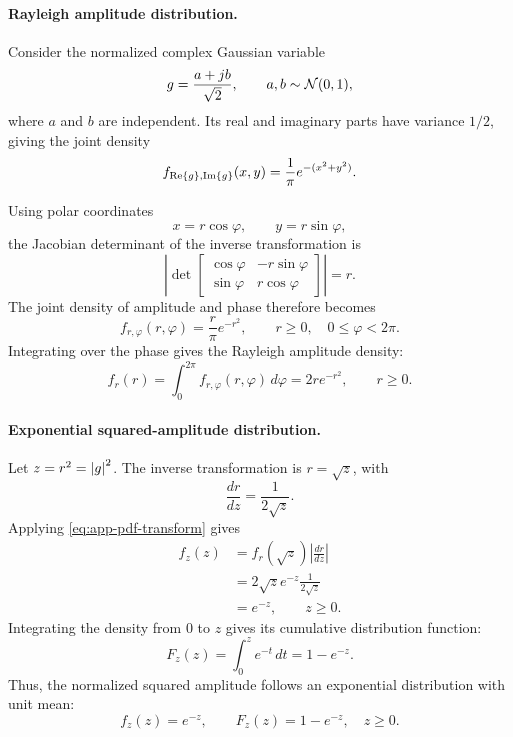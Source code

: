 \paragraph{Rayleigh amplitude distribution.}
Consider the normalized complex Gaussian variable
\begin{equation*}
	g=\frac{a+jb}{\sqrt{2}},
	\qquad
	a,b\sim\mathcal{N}(0,1),
\end{equation*}
where $a$ and $b$ are independent. Its real and imaginary parts have variance $1/2$, giving the joint density
\begin{equation*}
	f_{\operatorname{Re}\left\{g\right\},\operatorname{Im}\left\{g\right\}}(x,y)
	=\frac{1}{\pi}e^{-(x^2+y^2)}.
\end{equation*}

Using polar coordinates
\begin{equation*}
	x=r\cos\varphi,\qquad
	y=r\sin\varphi,
\end{equation*}
the Jacobian determinant of the inverse transformation is
\begin{equation*}
	\left|
	\det{
		\begin{bmatrix}
			\cos\varphi&-r\sin\varphi\\
			\sin\varphi&r\cos\varphi
	\end{bmatrix}}
	\right|=r.
\end{equation*}
The joint density of amplitude and phase therefore becomes
\begin{equation*}
	f_{r,\varphi}(r,\varphi)
	=\frac{r}{\pi}e^{-r^2},
	\qquad
	r\geq0,\quad 0\leq\varphi<2\pi.
\end{equation*}
Integrating over the phase gives the Rayleigh amplitude density:
\begin{equation}\label{eq:app-rayleigh-pdf}
	\boxed{
		f_r(r)=\int_0^{2\pi}
		f_{r,\varphi}(r,\varphi)\,d\varphi
		=2re^{-r^2},\qquad r\geq0.
	}
\end{equation}

\paragraph{Exponential squared-amplitude distribution.}
Let $z=r^2=\left|g\right|^2$. The inverse transformation is $r=\sqrt{z}$, with
\begin{equation*}
	\frac{dr}{dz}=\frac{1}{2\sqrt{z}}.
\end{equation*}
Applying \eqref{eq:app-pdf-transform} gives
\begin{align*}
	f_z(z)
	&=f_r(\sqrt{z})
	\left|\frac{dr}{dz}\right|\\
	&=2\sqrt{z}e^{-z}
	\frac{1}{2\sqrt{z}}\\
	&=e^{-z},\qquad z\geq0.
\end{align*}
Integrating the density from $0$ to $z$ gives its cumulative distribution function:
\begin{equation*}
	F_z(z)=\int_0^z e^{-t}\,dt=1-e^{-z}.
\end{equation*}
Thus, the normalized squared amplitude follows an exponential distribution with unit mean:
\begin{equation}\label{eq:app-exponential}
	\boxed{
		f_z(z)=e^{-z},\qquad
		F_z(z)=1-e^{-z},\quad z\geq0.
	}
\end{equation}


